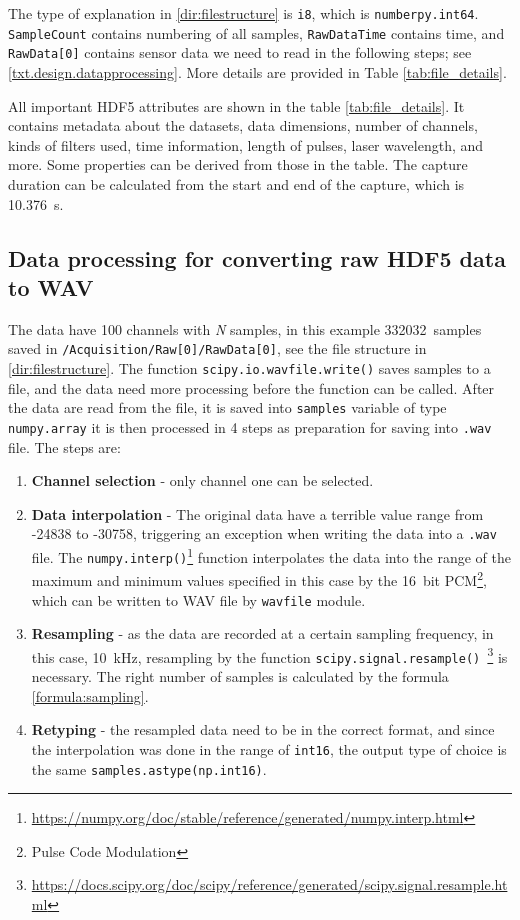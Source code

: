 The type of explanation in \ref{dir:filestructure} is \verb|i8|, which is \verb|numberpy.int64|. \verb|SampleCount| contains numbering of all samples, \verb|RawDataTime| contains time, and \verb|RawData[0]| contains sensor data we need to read in the following steps; see \ref{txt.design.datapprocessing}. More details are provided in Table \ref{tab:file_details}.

All important HDF5 attributes are shown in the table \ref{tab:file_details}. It contains metadata about the datasets, data dimensions, number of channels, kinds of filters used, time information, length of pulses, laser wavelength, and more. Some properties can be derived from those in the table. The capture duration can be calculated from the start and end of the capture, which is \qty{10,376}{\second}.

\subsection{Data processing for converting raw HDF5 data to WAV}\label{txt.implementation.processing}

The data have 100 channels with \textit{N} samples, in this example \qty{332032}{samples} saved in \verb|/Acquisition/Raw[0]/RawData[0]|, see the file structure in \ref{dir:filestructure}. The function \verb|scipy.io.wavfile.write()| saves samples to a file, and the data need more processing before the function can be called. After the data are read from the file, it is saved into \verb|samples| variable of type \verb|numpy.array| it is then processed in 4 steps as preparation for saving into \verb|.wav| file. The steps are:

\begin{enumerate}
    \item \textbf{Channel selection} - only channel one can be selected.
    \item \textbf{Data interpolation} - The original data have a terrible value range from -24838 to -30758, triggering an exception when writing the data into a \verb|.wav| file. The \verb|numpy.interp()|\footnote{\url{https://numpy.org/doc/stable/reference/generated/numpy.interp.html}} function interpolates the data into the range of the maximum and minimum values specified in this case by the \qty{16}{bit} PCM\footnote{Pulse Code Modulation}, which can be written to WAV file by \verb|wavfile| module.
    \item \textbf{Resampling} - as the data are recorded at a certain sampling frequency, in this case, \qty{10}{\kHz}, resampling by the function \verb|scipy.signal.resample() |\footnote{\url{https://docs.scipy.org/doc/scipy/reference/generated/scipy.signal.resample.html}} is necessary. The right number of samples is calculated by the formula \ref{formula:sampling}.
    \item \textbf{Retyping} - the resampled data need to be in the correct format, and since the interpolation was done in the range of \verb|int16|, the output type of choice is the same \verb|samples.astype(np.int16)|.
\end{enumerate}

